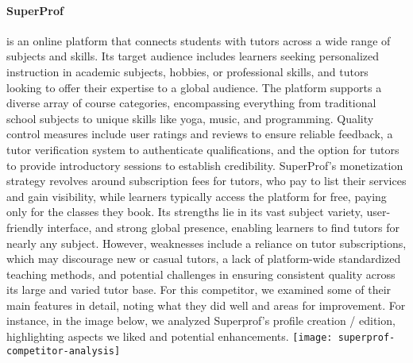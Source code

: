 \paragraph{SuperProf} is an online platform that connects students with tutors across a wide range of subjects and skills.
Its target audience includes learners seeking personalized instruction in academic subjects, hobbies, or professional skills, and tutors looking to offer their expertise to a global audience.
The platform supports a diverse array of course categories, encompassing everything from traditional school subjects to unique skills like yoga, music, and programming.
Quality control measures include user ratings and reviews to ensure reliable feedback, a tutor verification system to authenticate qualifications, and the option for tutors to provide introductory sessions to establish credibility.
SuperProf's monetization strategy revolves around subscription fees for tutors, who pay to list their services and gain visibility, while learners typically access the platform for free, paying only for the classes they book.
Its strengths lie in its vast subject variety, user-friendly interface, and strong global presence, enabling learners to find tutors for nearly any subject.
However, weaknesses include a reliance on tutor subscriptions, which may discourage new or casual tutors, a lack of platform-wide standardized teaching methods, and potential challenges in ensuring consistent quality across its large and varied tutor base.\newline
For this competitor, we examined some of their main features in detail, noting what they did well and areas for improvement.
For instance, in the image below, we analyzed Superprof's profile creation / edition, highlighting aspects we liked and potential enhancements.
\newline\newline
\texttt{[image: superprof-competitor-analysis]}\newline

